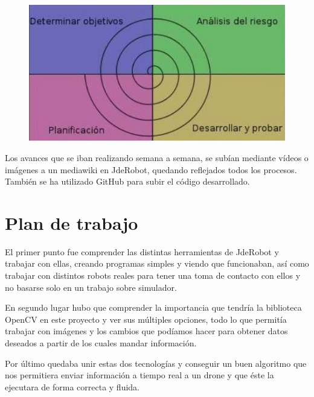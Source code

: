 \begin{figure}[H]
	\centering
		\includegraphics{imgs/metodologia-espiral.jpg}
	\label{fig:Desarrollo en espiral}
\end{figure}

\hspace{1 cm} Los avances que se iban realizando semana a semana, se sub\'ian mediante v\'ideos o im\'agenes a un mediawiki en JdeRobot, quedando reflejados todos los procesos. Tambi\'en se ha utilizado GitHub para subir el c\'odigo desarrollado.  

\section{Plan de trabajo}
\hspace{1 cm} El primer punto fue comprender las distintas herramientas de JdeRobot y trabajar con ellas, creando programas simples y viendo que funcionaban, as\'i como trabajar con distintos robots reales para tener una toma de contacto con ellos y no basarse solo en un trabajo sobre simulador. 

\hspace{1 cm} En segundo lugar hubo que comprender la importancia que tendr\'ia la biblioteca OpenCV en este proyecto y ver sus m\'ultiples opciones, todo lo que permit\'ia trabajar con im\'agenes y los cambios que pod\'iamos hacer para obtener datos deseados a partir de los cuales mandar informaci\'on. 

\hspace{1 cm} Por \'ultimo quedaba unir estas dos tecnolog\'ias y conseguir un buen algoritmo que nos permitiera enviar informaci\'on a tiempo real a un drone y que \'este la ejecutara de forma correcta y fluida.  




